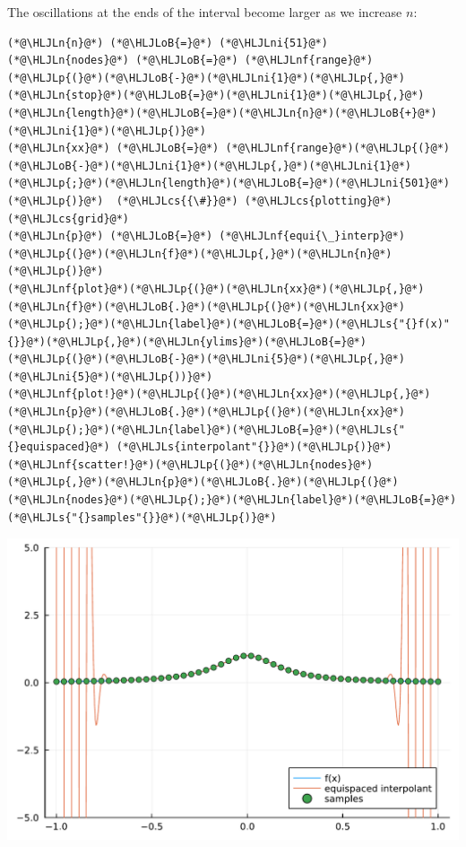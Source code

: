 \documentclass[12pt,a4paper]{article}
\newcommand{\HLJLn}[1]{#1}
\newcommand{\HLJLnf}[1]{\textcolor[RGB]{66,102,213}{#1}}
\newcommand{\HLJLs}[1]{\textcolor[RGB]{201,61,57}{#1}}
\newcommand{\HLJLni}[1]{\textcolor[RGB]{59,151,46}{#1}}
\newcommand{\HLJLoB}[1]{\textcolor[RGB]{102,102,102}{\textbf{#1}}}
\newcommand{\HLJLp}[1]{#1}
\newcommand{\HLJLcs}[1]{\textcolor[RGB]{153,153,119}{\textit{#1}}}
\begin{document}
The oscillations at the ends of the interval become larger as we increase $n$:


\begin{lstlisting}
(*@\HLJLn{n}@*) (*@\HLJLoB{=}@*) (*@\HLJLni{51}@*)
(*@\HLJLn{nodes}@*) (*@\HLJLoB{=}@*) (*@\HLJLnf{range}@*)(*@\HLJLp{(}@*)(*@\HLJLoB{-}@*)(*@\HLJLni{1}@*)(*@\HLJLp{,}@*)(*@\HLJLn{stop}@*)(*@\HLJLoB{=}@*)(*@\HLJLni{1}@*)(*@\HLJLp{,}@*)(*@\HLJLn{length}@*)(*@\HLJLoB{=}@*)(*@\HLJLn{n}@*)(*@\HLJLoB{+}@*)(*@\HLJLni{1}@*)(*@\HLJLp{)}@*)  
(*@\HLJLn{xx}@*) (*@\HLJLoB{=}@*) (*@\HLJLnf{range}@*)(*@\HLJLp{(}@*)(*@\HLJLoB{-}@*)(*@\HLJLni{1}@*)(*@\HLJLp{,}@*)(*@\HLJLni{1}@*)(*@\HLJLp{;}@*)(*@\HLJLn{length}@*)(*@\HLJLoB{=}@*)(*@\HLJLni{501}@*)(*@\HLJLp{)}@*)  (*@\HLJLcs{{\#}}@*) (*@\HLJLcs{plotting}@*) (*@\HLJLcs{grid}@*)
(*@\HLJLn{p}@*) (*@\HLJLoB{=}@*) (*@\HLJLnf{equi{\_}interp}@*)(*@\HLJLp{(}@*)(*@\HLJLn{f}@*)(*@\HLJLp{,}@*)(*@\HLJLn{n}@*)(*@\HLJLp{)}@*) 
(*@\HLJLnf{plot}@*)(*@\HLJLp{(}@*)(*@\HLJLn{xx}@*)(*@\HLJLp{,}@*)(*@\HLJLn{f}@*)(*@\HLJLoB{.}@*)(*@\HLJLp{(}@*)(*@\HLJLn{xx}@*)(*@\HLJLp{);}@*)(*@\HLJLn{label}@*)(*@\HLJLoB{=}@*)(*@\HLJLs{"{}f(x)"{}}@*)(*@\HLJLp{,}@*)(*@\HLJLn{ylims}@*)(*@\HLJLoB{=}@*)(*@\HLJLp{(}@*)(*@\HLJLoB{-}@*)(*@\HLJLni{5}@*)(*@\HLJLp{,}@*)(*@\HLJLni{5}@*)(*@\HLJLp{))}@*)
(*@\HLJLnf{plot!}@*)(*@\HLJLp{(}@*)(*@\HLJLn{xx}@*)(*@\HLJLp{,}@*)(*@\HLJLn{p}@*)(*@\HLJLoB{.}@*)(*@\HLJLp{(}@*)(*@\HLJLn{xx}@*)(*@\HLJLp{);}@*)(*@\HLJLn{label}@*)(*@\HLJLoB{=}@*)(*@\HLJLs{"{}equispaced}@*) (*@\HLJLs{interpolant"{}}@*)(*@\HLJLp{)}@*)
(*@\HLJLnf{scatter!}@*)(*@\HLJLp{(}@*)(*@\HLJLn{nodes}@*)(*@\HLJLp{,}@*)(*@\HLJLn{p}@*)(*@\HLJLoB{.}@*)(*@\HLJLp{(}@*)(*@\HLJLn{nodes}@*)(*@\HLJLp{);}@*)(*@\HLJLn{label}@*)(*@\HLJLoB{=}@*)(*@\HLJLs{"{}samples"{}}@*)(*@\HLJLp{)}@*)
\end{lstlisting}

\includegraphics[width=\linewidth]{jl_dOthw0/OP_methods_4_1.pdf}
\end{document}
